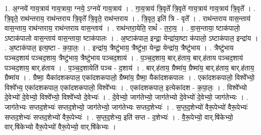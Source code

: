 \documentclass[17pt]{extarticle}
\begin{document}
1. अ॒ग्नये॑ गाय॒त्राय॑ गाय॒त्राया॒ ग्नये॒ ऽग्नये॑ गाय॒त्राय॑ । . गा॒य॒त्राय॑ त्रि॒वृते᳚ त्रि॒वृते॑ गाय॒त्राय॑ गाय॒त्राय॑ त्रि॒वृते᳚ । . त्रि॒वृते॒ राथ॑न्तराय॒ राथ॑न्तराय त्रि॒वृते᳚ त्रि॒वृते॒ राथ॑न्तराय । . त्रि॒वृत॒ इति॑ त्रि - वृते᳚ । . राथ॑न्तराय वास॒न्ताय॑ वास॒न्ताय॒ राथ॑न्तराय॒ राथ॑न्तराय वास॒न्ताय॑ । . राथ॑न्तरा॒येति॒ राथं᳚ - त॒रा॒य॒ । . वा॒स॒न्ताया॒ ष्टाक॑पालो॒ ऽष्टाक॑पालो वास॒न्ताय॑ वास॒न्ताया॒ ष्टाक॑पालः । . अ॒ष्टाक॑पाल॒ इन्द्रा॒ येन्द्रा॑या॒ष्टा क॑पालो॒ ऽष्टाक॑पाल॒ इन्द्रा॑य । . अ॒ष्टाक॑पाल॒ इत्य॒ष्टा - क॒पा॒लः॒ । . इन्द्रा॑य॒ त्रैष्टु॑भाय॒ त्रैष्टु॑भा॒ येन्द्रा॒ येन्द्रा॑य॒ त्रैष्टु॑भाय । . त्रैष्टु॑भाय पञ्चद॒शाय॑ पञ्चद॒शाय॒ त्रैष्टु॑भाय॒ त्रैष्टु॑भाय पञ्चद॒शाय॑ । . प॒ञ्च॒द॒शाय॒ बार्.ह॑ताय॒ बार्.ह॑ताय पञ्चद॒शाय॑ पञ्चद॒शाय॒ बार्.ह॑ताय । . प॒ञ्च॒द॒शायेति॑ पञ्च - द॒शाय॑ । . बार्.ह॑ताय॒ ग्रैष्मा॑य॒ ग्रैष्मा॑य॒ बार्.ह॑ताय॒ बार्.ह॑ताय॒ ग्रैष्मा॑य । . ग्रैष्मा॒ यैका॑दशकपाल॒ एका॑दशकपालो॒ ग्रैष्मा॑य॒ ग्रैष्मा॒ यैका॑दशकपालः । . एका॑दशकपालो॒ विश्वे᳚भ्यो॒ विश्वे᳚भ्य॒ एका॑दशकपाल॒ एका॑दशकपालो॒ विश्वे᳚भ्यः । . एका॑दशकपाल॒ इत्येका॑दश - क॒पा॒लः॒ । . विश्वे᳚भ्यो दे॒वेभ्यो॑ दे॒वेभ्यो॒ विश्वे᳚भ्यो॒ विश्वे᳚भ्यो दे॒वेभ्यः॑ । . दे॒वेभ्यो॒ जाग॑तेभ्यो॒ जाग॑तेभ्यो दे॒वेभ्यो॑ दे॒वेभ्यो॒ जाग॑तेभ्यः । . जाग॑तेभ्यः सप्तद॒शेभ्यः॑ सप्तद॒शेभ्यो॒ जाग॑तेभ्यो॒ जाग॑तेभ्यः सप्तद॒शेभ्यः॑ । . स॒प्त॒द॒शेभ्यो॑ वैरू॒पेभ्यो॑ वैरू॒पेभ्यः॑ सप्तद॒शेभ्यः॑ सप्तद॒शेभ्यो॑ वैरू॒पेभ्यः॑ । . स॒प्त॒द॒शेभ्य॒ इति॑ सप्त - द॒शेभ्यः॑ । . वै॒रू॒पेभ्यो॒ वार्.षि॑केभ्यो॒ वार्.षि॑केभ्यो वैरू॒पेभ्यो॑ वैरू॒पेभ्यो॒ वार्.षि॑केभ्यः । \newline
\end{document}
